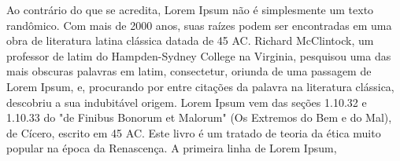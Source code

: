 \documentclass[a4, 12pt]{report}
\begin{document}
Ao contrário do que se acredita, Lorem Ipsum não é simplesmente um
texto randômico. Com mais de 2000 anos, suas raízes podem ser
encontradas em uma obra de literatura latina clássica datada de 45
AC. Richard McClintock, um professor de latim do Hampden-Sydney
College na Virginia, pesquisou uma das mais obscuras palavras em
latim, consectetur, oriunda de uma passagem de Lorem Ipsum, e,
procurando por entre citações da palavra na literatura clássica,
descobriu a sua indubitável origem. Lorem Ipsum vem das seções 1.10.32
e 1.10.33 do "de Finibus Bonorum et Malorum" (Os Extremos do Bem e do
Mal), de Cícero, escrito em 45 AC. Este livro é um tratado de teoria
da ética muito popular na época da Renascença. A primeira linha de
Lorem Ipsum,
\end{document}
